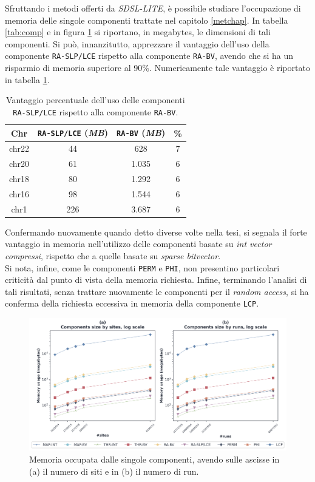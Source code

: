 Sfruttando i metodi offerti da \textit{SDSL-LITE}, è possibile studiare
l'occupazione di memoria delle singole componenti trattate nel capitolo
\ref{metchap}. 
In tabella \ref{tab:comp} e in figura \ref{fig:comp}
si riportano, in megabytes, 
le dimensioni di tali componenti. Si può,
innanzitutto, apprezzare il vantaggio dell'uso della componente
\texttt{RA-SLP/LCE} rispetto alla 
componente \texttt{RA-BV}, avendo che si ha un risparmio di memoria superiore al
90\%. Numericamente tale vantaggio è riportato in tabella
\ref{tab:slppanel}.
\begin{table}
  \centering
  \caption{Vantaggio percentuale dell'uso delle componenti \texttt{RA-SLP/LCE}
    rispetto alla componente \texttt{RA-BV}.}
  \begin{tabular}{c||c|c|c}
    \textbf{Chr} & \textbf{\texttt{RA-SLP/LCE}
                                          (\textit{MB})}
    & \textbf{\texttt{RA-BV} (\textit{MB})} & \textbf{\%}\\
    \hline
    \hline
    chr22 & 44 & 628 & 7\\
    chr20 & 61 & 1.035 & 6\\
    chr18 & 80 & 1.292 & 6\\
    chr16 & 98 & 1.544 & 6\\
    chr1 & 226 & 3.687 & 6\\
  \end{tabular}
  \label{tab:slppanel}
\end{table}
Confermando nuovamente quando detto diverse volte nella tesi, si segnala il
forte vantaggio in memoria nell'utilizzo delle componenti basate su \textit{int
  vector compressi}, rispetto che a quelle basate su \textit{sparse
  bitvector}.\\
Si nota, infine, come le componenti \texttt{PERM} e \texttt{PHI}, non
presentino particolari criticità dal punto di vista della memoria
richiesta. Infine, terminando l'analisi di tali risultati, senza trattare
nuovamente le componenti per il \textit{random access}, si ha conferma della
richiesta eccessiva in memoria della componente \texttt{LCP}.
\begin{figure}
  \centering
    \includegraphics[width=\linewidth]{img/comp_mem.png}
  \caption{Memoria occupata dalle singole componenti, avendo sulle ascisse in
    (a) il numero di siti e in (b) il numero di run. }
  \label{fig:comp}
\end{figure}
